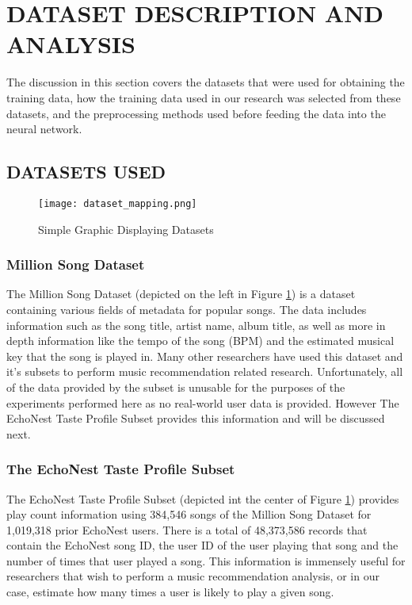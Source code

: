\section{DATASET DESCRIPTION AND ANALYSIS}
The discussion in this section covers the datasets that were used for obtaining the training data, how the training data used in our research was selected from these datasets, and the preprocessing methods used before feeding the data into the neural network. 

    \subsection{DATASETS USED}
        \begin{figure}[H]
            \texttt{[image: dataset\_mapping.png]}
            \caption{Simple Graphic Displaying Datasets}
            \label{fig:datasets}
        \end{figure}

        \subsubsection{Million Song Dataset}
            The Million Song Dataset (depicted on the left in Figure \ref{fig:datasets}) is a dataset containing various fields of metadata for popular songs. \cite{msd_site} The data includes information such as the song title, artist name, album title, as well as more in depth information like the tempo of the song (BPM) and the estimated musical key that the song is played in. Many other researchers have used this dataset and it's subsets to perform music recommendation related research. \cite{Wang2014,Wang:2014:ICH:2647868.2654940,NIPS2013_5004} Unfortunately, all of the data provided by the subset is unusable for the purposes of the experiments performed here as no real-world user data is provided. However The EchoNest Taste Profile Subset provides this information and will be discussed next.
        \subsubsection{The EchoNest Taste Profile Subset}
        The EchoNest Taste Profile Subset (depicted int the center of Figure \ref{fig:datasets}) provides play count information using 384,546 songs of the Million Song Dataset for 1,019,318 prior EchoNest users. \cite{etp_site} There is a total of 48,373,586 records that contain the EchoNest song ID, the user ID of the user playing that song and the number of times that user played a song. This information is immensely useful for researchers that wish to perform a music recommendation analysis, or in our case, estimate how many times a user is likely to play a given song. 
        
